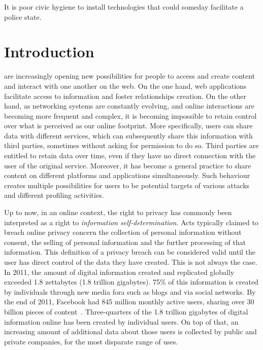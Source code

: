 \begin{savequote}[75mm] 
It is poor civic hygiene to install technologies that could someday facilitate a police state.
\end{savequote}

\chapter{Introduction}

 are increasingly opening new possibilities for people to access and create content and interact with one another on the web. On the one hand, web applications facilitate access to information and foster relationships creation. On the other hand, as networking systems are constantly evolving, and online interactions are becoming more frequent and complex, it is becoming impossible to retain control over what is perceived as our online footprint. More specifically, users can share data with different services, which can subsequently share this information with third parties, sometimes without asking for permission to do so. Third parties are entitled to retain data over time, even if they have no direct connection with the user of the original service. Moreover, it has become a general practice to share content on different platforms and applications simultaneously. Such behaviour creates multiple possibilities for users to be potential targets of various attacks and different profiling activities.

Up to now, in an online context, the right to privacy has commonly been interpreted as a right to \emph{information self-determination}. Acts typically claimed to breach online privacy concern the collection of personal information without consent, the selling of personal information and the further processing of that information. This definition of a privacy breach can be considered valid until the user has direct control of the data they have created. This is not always the case. In 2011, the amount of digital information created and replicated globally exceeded 1.8 zettabytes (1.8 trillion gigabytes). 75\% of this information is created by individuals through new media fora such as blogs and via social networks. By the end of 2011, Facebook had 845 million monthly active users, sharing over 30 billion pieces of content~\cite{library-briefing}. Three-quarters of the 1.8 trillion gigabytes of digital information online has been created by individual users. On top of that, an increasing amount of additional data about those users is collected by public and private companies, for the most disparate range of uses.

